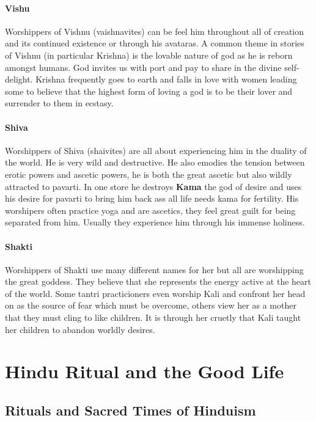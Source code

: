 \documentclass{article}
\begin{document}
\paragraph{Vishu}
\label{par:vishu}
Worshippers of Vishnu (vaishnavites) can be feel him throughout all of creation and its continued existence or through his avataras. A common theme in stories of Vishnu (in particular Krishna) is the lovable nature of god as he is reborn amongst humans. God invites us with port and pay to share in the divine self-delight. Krishna frequently goes to earth and falls in love with women leading some to believe that the highest form of loving a god is to be their lover and surrender to them in ecstasy.

\paragraph{Shiva}
\label{par:shiva}
Worshippers of Shiva (shaivites) are all about experiencing him in the duality of the world. He is very wild and destructive. He also emodies the tension between erotic powers and ascetic powers, he is both the great ascetic but also wildly attracted to pavarti. In one store he destroys \textbf{Kama} the god of desire and uses his desire for pavarti to bring him back ass all life needs kama for fertility. His worshipers often practice yoga and are ascetics, they feel great guilt for being separated from him. Usually they experience him through his immense holiness.

\paragraph{Shakti}
\label{par:shakti}
Worshippers of Shakti use many different names for her but all are worshipping the great goddess. They believe that she represents the energy active at the heart of the world. Some tantri practicioners even worship Kali and confront her head on as the source of fear which must be overcome, others view her as a mother that they must cling to like children. It is through her cruetly that Kali taught her children to abandon worldly desires.

\section{Hindu Ritual and the Good Life}
\label{sec:hindu_ritual_and_the_good_life}
\subsection{Rituals and Sacred Times of Hinduism}
\label{sub:rituals_and_sacred_times_of_hinduism}
\end{document}
